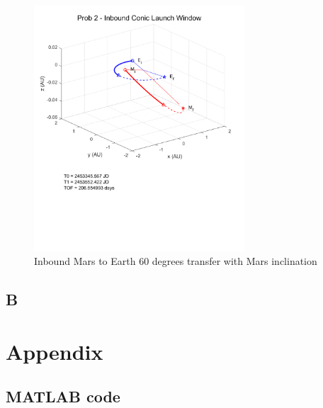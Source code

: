 \documentclass[conf]{new-aiaa}
\begin{document}
\begin{figure}[H]
    \centering 
    \includegraphics[width=0.7\textwidth]{Prob 2 - Inbound Conic Launch Window.pdf}
    \caption{Inbound Mars to Earth 60 degrees transfer with Mars inclination}
\end{figure}

\subsection*{B}


\newpage
\section*{Appendix} 

\subsection*{MATLAB code} 

\begin{lstlisting}

    
	
\end{lstlisting}






% 
\end{document}
